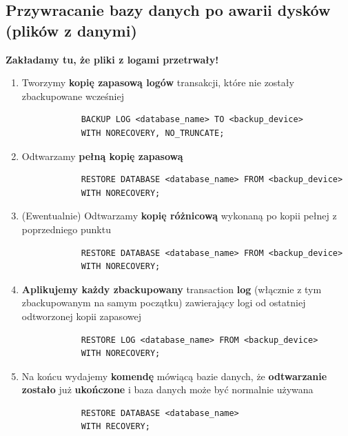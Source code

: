 \documentclass[a4paper]{article}
\begin{document}
    \subsection{Przywracanie bazy danych po awarii dysków (plików z danymi)}
    \textbf{Zakładamy tu, że pliki z logami przetrwały!}

    \begin{enumerate}
        \item Tworzymy \textbf{kopię zapasową logów} transakcji, które nie zostały zbackupowane wcześniej
        \begin{verbatim}
            BACKUP LOG <database_name> TO <backup_device>
            WITH NORECOVERY, NO_TRUNCATE;
        \end{verbatim}
        \item Odtwarzamy \textbf{pełną kopię zapasową}
        \begin{verbatim}
            RESTORE DATABASE <database_name> FROM <backup_device>
            WITH NORECOVERY;
        \end{verbatim}
        \item (Ewentualnie) Odtwarzamy \textbf{kopię różnicową} wykonaną po kopii pełnej z poprzedniego punktu
        \begin{verbatim}
            RESTORE DATABASE <database_name> FROM <backup_device>
            WITH NORECOVERY;
        \end{verbatim}
        \item \textbf{Aplikujemy każdy zbackupowany} transaction \textbf{log} (włącznie z tym zbackupowanym na samym
        początku) zawierający logi od ostatniej odtworzonej kopii zapasowej
        \begin{verbatim}
            RESTORE LOG <database_name> FROM <backup_device>
            WITH NORECOVERY;
        \end{verbatim}
        \item Na końcu wydajemy \textbf{komendę} mówiącą bazie danych, że \textbf{odtwarzanie zostało} już
        \textbf{ukończone} i baza danych może być normalnie używana
        \begin{verbatim}
            RESTORE DATABASE <database_name>
            WITH RECOVERY;
        \end{verbatim}
    \end{enumerate}
\end{document}
